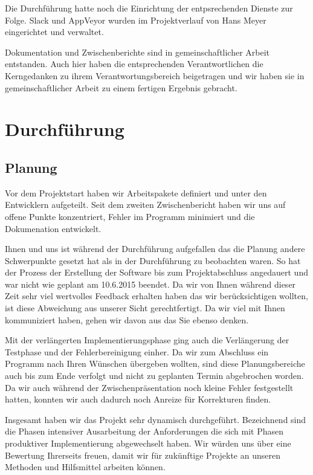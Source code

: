 \documentclass[12pt]{article}
\begin{document}
Die Durchführung hatte noch die Einrichtung der entpsrechenden Dienste zur Folge. Slack und AppVeyor wurden im Projektverlauf von Hans Meyer eingerichtet und verwaltet. 
\newline

Dokumentation und Zwischenberichte sind in gemeinschaftlicher Arbeit entstanden. Auch hier haben die entsprechenden Verantwortlichen die Kerngedanken zu ihrem Verantwortungsbereich beigetragen und wir haben sie in gemeinschaftlicher Arbeit zu einem fertigen Ergebnis gebracht.
\newline

\newpage
\section{Durchführung}
\subsection{Planung}

Vor dem Projektstart haben wir Arbeitspakete definiert und unter den Entwicklern aufgeteilt. Seit dem zweiten Zwischenbericht haben wir uns auf offene Punkte konzentriert, Fehler im Programm minimiert und die Dokumenation entwickelt.
\newline 

Ihnen und uns ist während der Durchführung aufgefallen das die Planung andere Schwerpunkte gesetzt hat als in der Durchführung zu beobachten waren. So hat der Prozess der Erstellung der Software bis zum Projektabschluss angedauert und war nicht wie geplant am 10.6.2015 beendet. Da wir von Ihnen während dieser Zeit sehr viel wertvolles Feedback erhalten haben das wir berücksichtigen wollten, ist diese Abweichung aus unserer Sicht gerechtfertigt. Da wir viel mit Ihnen kommuniziert haben, gehen wir davon aus das Sie ebenso denken.
\newline

Mit der verlängerten Implementierungsphase ging auch die Verlängerung der Testphase und der Fehlerbereinigung einher. Da wir zum Abschluss ein Programm nach Ihren Wünschen übergeben wollten, sind diese Planungsbereiche auch bis zum Ende verfolgt und nicht zu geplanten Termin abgebrochen worden. Da wir auch während der Zwischenpräsentation noch kleine Fehler festgestellt hatten, konnten wir auch dadurch noch Anreize für Korrekturen finden.
\newline

Insgesamt haben wir das Projekt sehr dynamisch durchgeführt. Bezeichnend sind die Phasen intensiver Ausarbeitung der Anforderungen die sich mit Phasen produktiver Implementierung abgewechselt haben. Wir würden uns über eine Bewertung Ihrerseits freuen, damit wir für zukünftige Projekte an unseren Methoden und Hilfsmittel arbeiten können.
\end{document}
